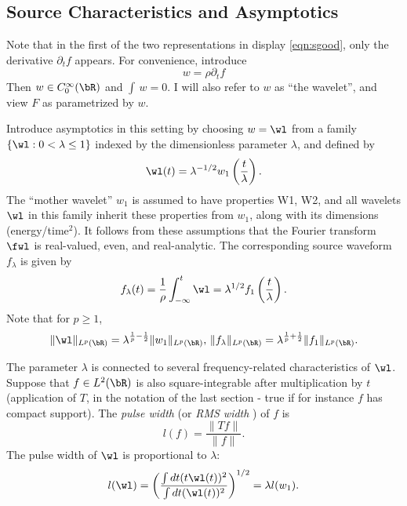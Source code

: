 \subsection{Source Characteristics and Asymptotics}

Note that in the first of the two representations in display \ref{eqn:sgood}, only the
derivative $\partial_tf$ appears. For convenience, introduce
\begin{equation}
  \label{eqn:wavelet}
  w = \rho \partial_t f
\end{equation}
Then  $w \in C^{\infty}_0(\bR)$ and $\int \, w = 0$. I will also
refer to $w$ as ``the wavelet'', and view $F$ as parametrized by $w$.

Introduce asymptotics in this setting by choosing $w = \wl$
from a family $\{\wl:0 <\lambda \le 1\}$ indexed by the dimensionless parameter
$\lambda$, and defined by
\begin{equation}
  \label{eqn:wfam}
  \wl(t) = \lambda^{-1/2}w_1\left(\frac{t}{\lambda}\right).
\end{equation}
The  ``mother wavelet'' $w_1$ is assumed to have properties W1, W2, and
all wavelets $\wl$ in this family
inherit these properties from $w_1$, along with its dimensions
(energy/time$^2$). It follows from these assumptions that the Fourier transform $\fwl$ is
real-valued, even, and real-analytic. The corresponding source waveform $f_{\lambda}$ is
given by
\begin{equation}
  \label{eqn:flambda}
  f_{\lambda}(t) =\frac{1}{\rho} \int_{-\infty}^t\wl =
  \lambda^{1/2}f_1\left(\frac{t}{\lambda}\right).
\end{equation}
Note that for $p \ge 1$,
\begin{equation}
  \label{eqn:lambdanorms}
  \|\wl\|_{L^p(\bR)} = \lambda ^{\frac{1}{p}-\frac{1}{2}}\|w_1\|_{L^p(\bR)},\,\|f_{\lambda}\|_{L^p(\bR)}
  = \lambda ^{\frac{1}{p}+\frac{1}{2}} \|f_1\|_{L^p(\bR)}.
\end{equation}


The parameter $\lambda$ is connected to several frequency-related
characteristics of $\wl$. Suppose that $f \in L^2(\bR)$ is also square-integrable after
multiplication by $t$ (application of $T$, in the notation of the last
section - true if for instance $f$ has compact
support). The {\em pulse width} (or {\em RMS width} ) of $f$ is
\begin{equation}
  \label{eqn:pw}
  l(f) = \frac{\|Tf\|}{\|f\|}.
\end{equation}
The pulse width of $\wl$ is proportional to $\lambda$:
\begin{equation}
  \label{eqn:wpw}
  l(\wl) = \left(\frac{\int dt (t \wl(t))^2}{\int dt (\wl(t))^2}
  \right)^{1/2} = \lambda l(w_1).
\end{equation}

